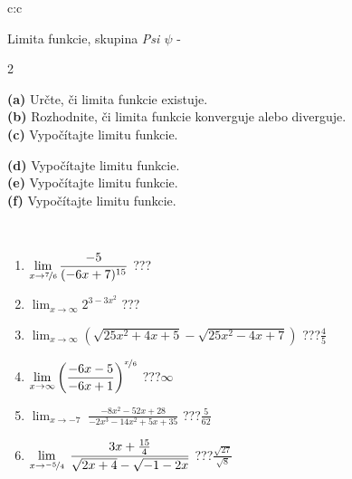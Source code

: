 \documentclass[10pt]{report}
\begin{document}
\newpage
\thispagestyle{empty}
\begin{tabular}{c:c}
\begin{minipage}[c][104.5mm][t]{0.5\linewidth}
\begin{center}
\vspace{7mm}
{\huge Limita funkcie, skupina \textit{Psi $\psi$} -}\\[5mm]
\begin{minipage}{0.95\linewidth}
\begin{center}
{\small \begin{multicols}{2} \raggedright
\textbf{(a)} Určte, či limita funkcie existuje. \\[1mm]
\textbf{(b)} Rozhodnite, či limita funkcie konverguje alebo diverguje. \\[1mm]
\textbf{(c)} Vypočítajte limitu funkcie. \par \columnbreak
\textbf{(d)} Vypočítajte limitu funkcie. \\[1mm]
\textbf{(e)} Vypočítajte limitu funkcie. \\[1mm]
\textbf{(f)} Vypočítajte limitu funkcie. \\[1mm]
\end{multicols}
}
\end{center}
\end{minipage}
\\[4mm]
\begin{minipage}{0.79\linewidth}
\begin{center}
\begin{varwidth}{\linewidth}
\begin{enumerate}
\normalsize
\item $\displaystyle\lim_{x\to\nicefrac{7}{6}}{\frac{-5}{(-6x+7)^{15}}}$\quad \dotfill\; ???\;\dotfill \quad {}
\item $\displaystyle\lim_{x\to\infty}{2^{3-3x^2}}$\quad \dotfill\; ???\;\dotfill \quad {}
\item $\displaystyle\lim_{x\to\infty}{\left(\sqrt{25x^2+4x+5} - \sqrt{25x^2-4x+7}\right)}$\quad \dotfill\; ???\;\dotfill \quad $\frac{4}{5}$
\item $\displaystyle\lim_{x\to\infty}{\left( \frac{-6x-5}{-6x+1} \right)^{\nicefrac{x}{6}}}$\quad \dotfill\; ???\;\dotfill \quad $\infty$
\item $\displaystyle\lim_{x\to -7}{\;\frac{-8x^2-52x+28}{-2x^3-14x^2+5x+35}}$\quad \dotfill\; ???\;\dotfill \quad $\frac{5}{62}$
\item $\displaystyle\lim_{x\to \nicefrac{-5}{4}}{\;\frac{3x+\frac{15}{4}}{\sqrt{2x+4} - \sqrt{-1-2x}}}$\quad \dotfill\; ???\;\dotfill \quad $\frac{\sqrt{27}}{\sqrt{8}}$

\end{enumerate}
\end{varwidth}
\end{center}
\end{minipage}
\end{center}
\end{minipage}
\end{tabular}
\end{document}
